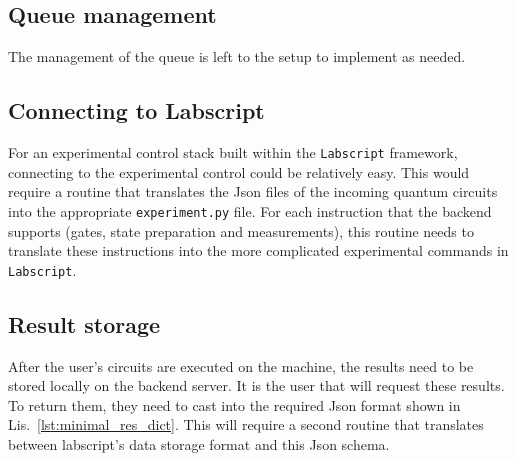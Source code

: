 \documentclass[a4paper, 10pt]{article}
\newcommand{\co}[1]{\texttt{#1}}
\begin{document}
\subsection{Queue management}
The management of the queue is left to the setup to implement as needed. 

\subsection{Connecting to Labscript}
For an experimental control stack built within the \co{Labscript} framework, connecting to the experimental control could be relatively easy.
This would require a routine that translates the Json files of the incoming quantum circuits into the appropriate \co{experiment.py} file.
For each instruction that the backend supports (gates, state preparation and measurements), this routine needs to translate these instructions into the more complicated experimental commands in \co{Labscript}. 

\subsection{Result storage} 
After the user's circuits are executed on the machine, the results need to be stored locally on the backend server.
It is the user that will request these results.
To return them, they need to cast into the required Json format shown in Lis.~\ref{lst:minimal_res_dict}.
This will require a second routine that translates between labscript's data storage format and this Json schema. 

\nocite{*}


\end{document}
